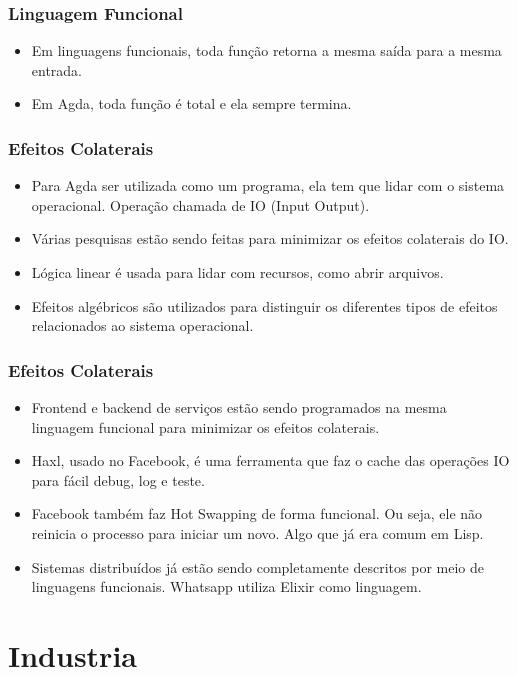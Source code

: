 \documentclass{beamer}
\begin{document}
\begin{frame}
\frametitle{Linguagem Funcional}
\begin{itemize}
  \item Em linguagens funcionais, toda função retorna a mesma saída para a mesma entrada.
  \item Em Agda, toda função é total e ela sempre termina.
\end{itemize}
\end{frame}

\begin{frame}
\frametitle{Efeitos Colaterais}
\begin{itemize}
  \item Para Agda ser utilizada como um programa, ela tem que lidar com o sistema operacional.
    Operação chamada de IO (Input Output).
  \item Várias pesquisas estão sendo feitas para minimizar os efeitos colaterais do IO.
  \item Lógica linear é usada para lidar com recursos, como abrir arquivos.
  \item Efeitos algébricos são utilizados para distinguir os diferentes tipos de efeitos
    relacionados ao sistema operacional.
\end{itemize}
\end{frame}

\begin{frame}
\frametitle{Efeitos Colaterais}
\begin{itemize}
  \item Frontend e backend de serviços estão sendo programados na mesma linguagem funcional
    para minimizar os efeitos colaterais.
  \item Haxl, usado no Facebook, é uma ferramenta que faz o cache das operações IO para
    fácil debug, log e teste.
  \item Facebook também faz Hot Swapping de forma funcional.
    Ou seja, ele não reinicia o processo para iniciar um novo.
    Algo que já era comum em Lisp.
  \item Sistemas distribuídos já estão sendo completamente descritos por meio de linguagens funcionais.
    Whatsapp utiliza Elixir como linguagem.
\end{itemize}
\end{frame}

\section{Industria}
\end{document}
